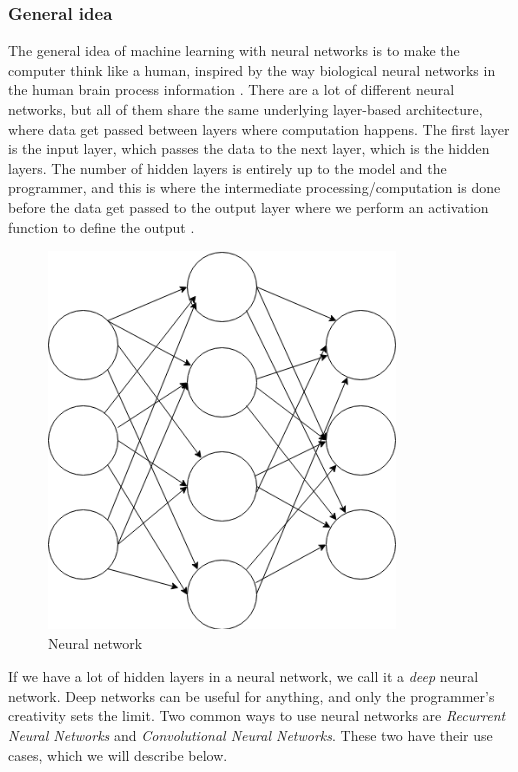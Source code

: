 \subsubsection{General idea}
The general idea of machine learning with neural networks is to make the computer think like a human, inspired by the way biological neural networks in the human 
brain process information \cite{neural_networks_0}. There are a lot of different neural networks, but all of them share the same underlying layer-based architecture, 
where data get passed between layers where computation happens. The first layer is the input layer, which passes the data to the next layer, which is the hidden layers. 
The number of hidden layers is entirely up to the model and the programmer, and this is where the intermediate processing/computation is done before the data get passed 
to the output layer where we perform an activation function to define the output \cite{neural_networks_1}.

\begin{figure}[h]
    \begin{center}
        \includegraphics[height=10cm]{neural_net.png}
        \caption{Neural network}
        \label{figure:neural_net}
    \end{center}
\end{figure}

If we have a lot of hidden layers in a neural network, we call it a \textit{deep} neural network. Deep networks can be useful for anything, and only the programmer's creativity sets the limit. Two common ways to use neural networks are \textit{Recurrent Neural Networks} and \textit{Convolutional Neural Networks}. These two have their use cases, which we will describe below.


